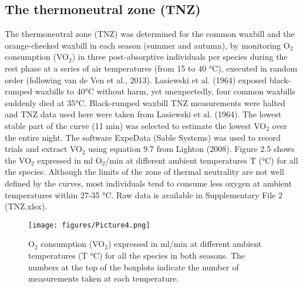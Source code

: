 \documentclass[10pt, twoside]{book} %
\newlength{\thumbheight}
\newlength{\thumbwidth}
\begin{document}
	\subsection*{The thermoneutral zone (TNZ)}
The thermoneutral zone (TNZ) was determined for the common waxbill and the orange-cheeked waxbill in each season (summer and autumn), by monitoring O$_{\text{2}}$ consumption (VO$_{\text{2}}$) in three post-absorptive individuals per species during the rest phase at a series of air temperatures (from 15 to 40 °C), executed in random order (following van de Ven et al., 2013). Lasiewski et al. (1964) exposed black-rumped waxbills to 40°C without harm, yet unexpectedly, four common waxbills suddenly died at 35°C. Black-rumped waxbill TNZ measurements were halted and TNZ data used here were taken from Lasiewski et al. (1964). The lowest stable part of the curve (11 min) was selected to estimate the lowest VO$_{\text{2}}$ over the entire night. The software ExpeData (Sable Systems) was used to record trials and extract VO$_{\text{2}}$ using equation 9.7 from Lighton (2008). Figure 2.5 shows the VO$_{\text{2}}$ expressed in ml O$_{\text{2}}$/min at different ambient temperatures T (°C) for all the species. Although the limits of the zone of thermal neutrality are not well defined by the curves, most individuals tend to consume less oxygen at ambient temperatures within 27-35 °C. Raw data is available in Supplementary File 2 (TNZ.xlsx).\\

\renewcommand{\thefigure}{1.\arabic{figure}}
	\begin{figure}[h!]
		\begin{center}
\small
			\texttt{[image: figures/Picture4.png]}
		\end{center}
		\begin{footnotesize}
			\caption{\footnotesize O$_{\text{2}}$ consumption (VO$_{\text{2}}$) expressed in ml/min at different ambient temperatures (T °C) for all the species in both seasons. The numbers at the top of the boxplots indicate the number of measurements taken at each temperature.\label{fig1.2}}
		\end{footnotesize}
	\end{figure}




\setlength{\thumbwidth}{0.8cm}
\setlength{\thumbheight}{1cm}
\pagestyle{mainmatter}
\renewcommand\thesection{\arabic{chapter}.\arabic{section}}
\renewcommand{\thefigure}{\arabic{chapter}.\arabic{figure}}
\end{document}
